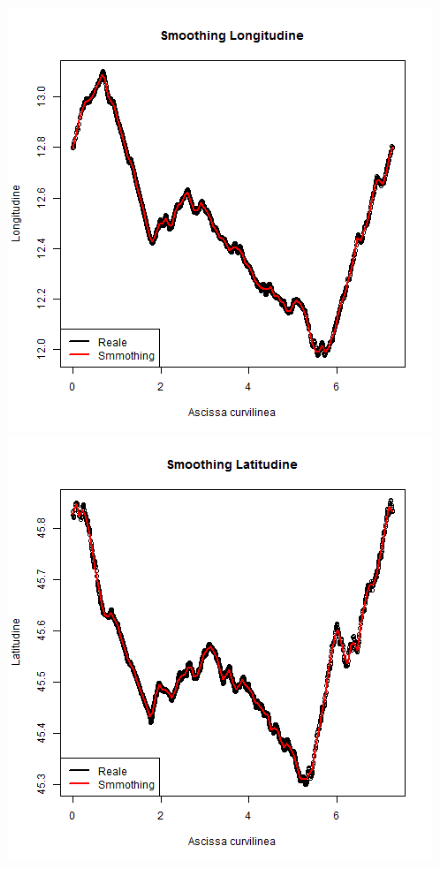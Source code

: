 \documentclass[a4paper,11pt,twoside,openright]{book}							%
\begin{document}
\begin{figure}[!t]
\centering
\begin{minipage}{.32\textwidth}
\includegraphics[width=\textwidth]{Immagini/Ven_Longitudine.png}
\includegraphics[width=\textwidth]{Immagini/Ven_Latitudine.png}

\end{minipage}
\end{figure}
\end{document}
